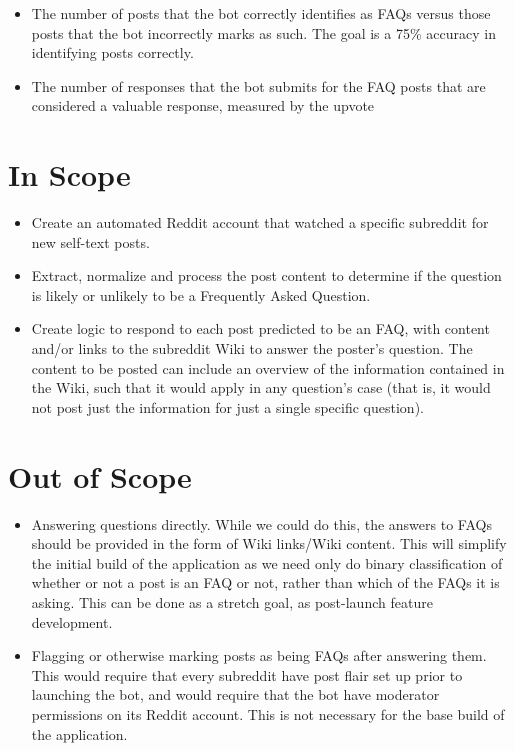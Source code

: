 \documentclass[dvips,11pt]{article}
\begin{document}
\begin{itemize}
\item The number of posts that the bot correctly identifies as FAQs versus those posts that the bot incorrectly marks as such. The goal is a 75\% accuracy in identifying posts correctly.
\item The number of responses that the bot submits for the FAQ posts that are considered a valuable response, measured by the upvote
\end{itemize}

\section{In Scope}

\begin{itemize}
\item Create an automated Reddit account that watched a specific subreddit for new self-text posts.
\item Extract, normalize and process the post content to determine if the question is likely or unlikely to be a Frequently Asked Question.
\item Create logic to respond to each post predicted to be an FAQ, with content and/or links to the subreddit Wiki to answer the poster's question. The content to be posted can include an overview of the information contained in the Wiki, such that it would apply in any question's case (that is, it would not post just the information for just a single specific question).
\end{itemize}

\section{Out of Scope}

\begin{itemize}
\item Answering questions directly. While we could do this, the answers to FAQs should be provided in the form of Wiki links/Wiki content. This will simplify the initial build of the application as we need only do binary classification of whether or not a post is an FAQ or not, rather than which of the FAQs it is asking. This can be done as a stretch goal, as post-launch feature development.
\item Flagging or otherwise marking posts as being FAQs after answering them. This would require that every subreddit have post flair set up prior to launching the bot, and would require that the bot have moderator permissions on its Reddit account. This is not necessary for the base build of the application.
\end{itemize}
\end{document}
